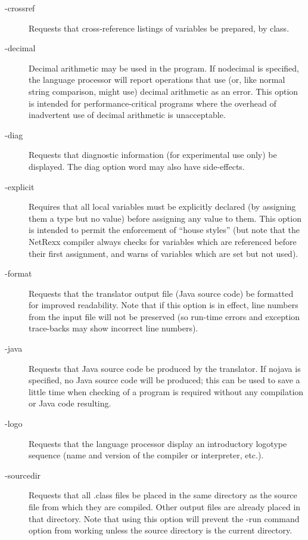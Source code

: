\begin{description}
\item[-crossref]
Requests that cross-reference listings of variables be prepared, by class.
\item[-decimal]
Decimal arithmetic may be used in the program. If nodecimal is specified, the language processor will report operations that use (or, like normal string comparison, might use) decimal arithmetic as an error. This option is intended for performance-critical programs where the overhead of inadvertent use of decimal arithmetic is unacceptable.
\item[-diag]
Requests that diagnostic information (for experimental use only) be displayed. The diag option word may also have side-effects.
\item[-explicit]
Requires that all local variables must be explicitly declared (by assigning them a type but no value) before assigning any value to them. This option is intended to permit the enforcement of “house styles” (but note that the NetRexx compiler always checks for variables which are referenced before their first assignment, and warns of variables which are set but not used).
\item[-format]
Requests that the translator output file (Java source code) be formatted for improved readability. Note that if this option is in effect, line numbers from the input file will not be preserved (so run-time errors and exception trace-backs may show incorrect line numbers).
\item[-java]
Requests that Java source code be produced by the translator. If nojava is specified, no Java source code will be produced; this can be used to save a little time when checking of a program is required without any compilation or Java code resulting.
\item[-logo]
Requests that the language processor display an introductory logotype sequence (name and version of the compiler or interpreter, etc.).
\item[-sourcedir]
Requests that all .class files be placed in the same directory as the source file from which they are compiled. Other output files are already placed in that directory. Note that using this option will prevent the -run command option from working unless the source directory is the current directory.

\end{description}
